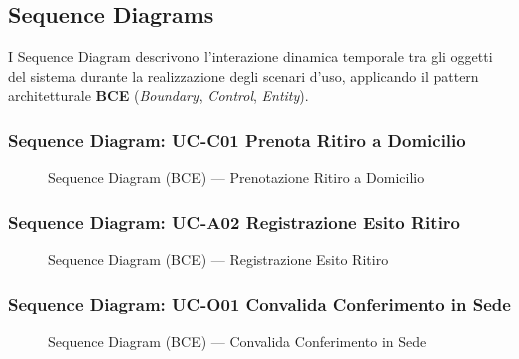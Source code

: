 \newpage
\subsection{Sequence Diagrams}
I Sequence Diagram descrivono l'interazione dinamica temporale tra gli oggetti del sistema durante la realizzazione degli scenari d'uso, applicando il pattern architetturale \textbf{BCE} (\textit{Boundary}, \textit{Control}, \textit{Entity}).

\subsubsection{Sequence Diagram: UC-C01 Prenota Ritiro a Domicilio}
\begin{figure}[H]
    \centering
    \caption{Sequence Diagram (BCE) --- Prenotazione Ritiro a Domicilio}
    \label{fig:seq_ritiro}
\end{figure}

\subsubsection{Sequence Diagram: UC-A02 Registrazione Esito Ritiro}
\begin{figure}[H]
    \centering
    \caption{Sequence Diagram (BCE) --- Registrazione Esito Ritiro}
    \label{fig:seq_esito_ritiro}
\end{figure}

\subsubsection{Sequence Diagram: UC-O01 Convalida Conferimento in Sede}
\begin{figure}[H]
    \centering
    \caption{Sequence Diagram (BCE) --- Convalida Conferimento in Sede}
    \label{fig:seq_conferimento_sede}
\end{figure}

